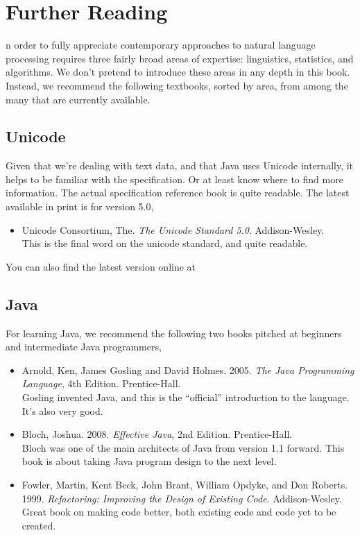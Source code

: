\chapter{Further Reading}\label{appendix:reading}

\noindent
{}n order to fully appreciate contemporary approaches to natural language
processing requires three fairly broad areas of expertise:
linguistics, statistics, and algorithms.  We don't pretend to
introduce these areas in any depth in this book.  Instead, we
recommend the following textbooks, sorted by area, from among the many
that are currently available.

\section{Unicode}

Given that we're dealing with text data, and that Java uses Unicode
internally, it helps to be familiar with the specification.  Or at
least know where to find more information.  The actual specification
reference book is quite readable.  The latest available in print is
for version 5.0,
%
\begin{itemize}
\item Unicode Consortium, The.  
{\it The Unicode Standard 5.0}.  
Addison-Wesley.
\\
{\footnotesize This is the final word on the unicode standard, and
quite readable.}
\end{itemize}
%
You can also find the latest version online at
%


\section{Java}

For learning Java, we recommend the following two books pitched at
beginners and intermediate Java programmers,
%
\begin{itemize}
\item Arnold, Ken, James Gosling and David Holmes.  2005.
{\it The Java Programming Language}, 4th Edition.  Prentice-Hall.
\\
{\footnotesize Gosling invented Java, and this is the ``official'' introduction to the
language.  It's also very good.}
%
\item Bloch, Joshua. 2008. {\it Effective Java}, 2nd Edition.  Prentice-Hall.
\\
{\footnotesize Bloch was one of the main architects of Java from
version 1.1 forward.  This book is about taking Java program design
to the next level.}
%
\item
Fowler, Martin, Kent Beck, John Brant, William Opdyke, and Don Roberts.
1999.
{\it Refactoring: Improving the Design of Existing Code}.
Addison-Wesley.
\\
{\footnotesize Great book on making code better, both existing
code and code yet to be created.}
\end{itemize}
%

